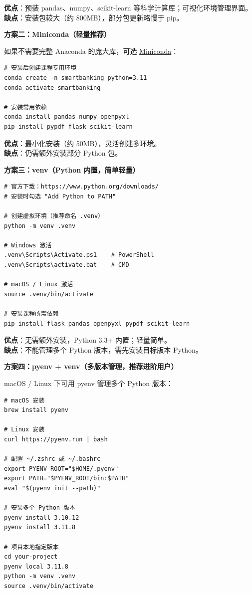 \textbf{优点}：预装 pandas、numpy、scikit-learn 等科学计算库；可视化环境管理界面。\\
\textbf{缺点}：安装包较大（约 800MB），部分包更新略慢于 pip。

\textbf{方案二：Miniconda（轻量推荐）}

如果不需要完整 Anaconda 的庞大库，可选 \href{https://docs.conda.io/en/latest/miniconda.html}{Miniconda}：

\begin{lstlisting}[style=shell]
# 安装后创建课程专用环境
conda create -n smartbanking python=3.11
conda activate smartbanking

# 安装常用依赖
conda install pandas numpy openpyxl
pip install pypdf flask scikit-learn
\end{lstlisting}

\textbf{优点}：最小化安装（约 50MB），灵活创建多环境。\\
\textbf{缺点}：仍需额外安装部分 Python 包。

\textbf{方案三：venv（Python 内置，简单轻量）}

\begin{lstlisting}[style=shell]
# 官方下载：https://www.python.org/downloads/
# 安装时勾选 "Add Python to PATH"

# 创建虚拟环境（推荐命名 .venv）
python -m venv .venv

# Windows 激活
.venv\Scripts\Activate.ps1    # PowerShell
.venv\Scripts\activate.bat    # CMD

# macOS / Linux 激活
source .venv/bin/activate

# 安装课程所需依赖
pip install flask pandas openpyxl pypdf scikit-learn
\end{lstlisting}

\textbf{优点}：无需额外安装，Python 3.3+ 内置；轻量简单。\\
\textbf{缺点}：不能管理多个 Python 版本，需先安装目标版本 Python。

\textbf{方案四：pyenv + venv（多版本管理，推荐进阶用户）}

macOS / Linux 下可用 pyenv 管理多个 Python 版本：

\begin{lstlisting}[style=shell]
# macOS 安装
brew install pyenv

# Linux 安装
curl https://pyenv.run | bash

# 配置 ~/.zshrc 或 ~/.bashrc
export PYENV_ROOT="$HOME/.pyenv"
export PATH="$PYENV_ROOT/bin:$PATH"
eval "$(pyenv init --path)"

# 安装多个 Python 版本
pyenv install 3.10.12
pyenv install 3.11.8

# 项目本地指定版本
cd your-project
pyenv local 3.11.8
python -m venv .venv
source .venv/bin/activate
\end{lstlisting}

